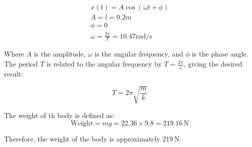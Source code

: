 \documentclass[journal,12pt,twocolumn]{IEEEtran}
\theoremstyle{remark}
\begin{document}
\begin{align}
x(t) = A\cos(\omega t + \phi) \\
A = l = 0.2m \\
\phi = 0 \\
\omega = \frac{2\pi}{T} = 10.47 \text{rad/s} 
\end{align}

Where \(A\) is the amplitude, \(\omega\) is the angular frequency, and \(\phi\) is the phase angle. The period \(T\) is related to the angular frequency by \(T = \frac{2\pi}{\omega}\), giving the desired result:

\begin{equation}
T = 2\pi\sqrt{\frac{m}{k}}
\end{equation}


The weight of th body is defined as:
\begin{equation}
\text{Weight} = mg = 22.36 \times 9.8 = 219.16 \, \text{N}
\end{equation}

Therefore, the weight of the body is approximately \(219 \, \text{N}\).
	
\end{document}
